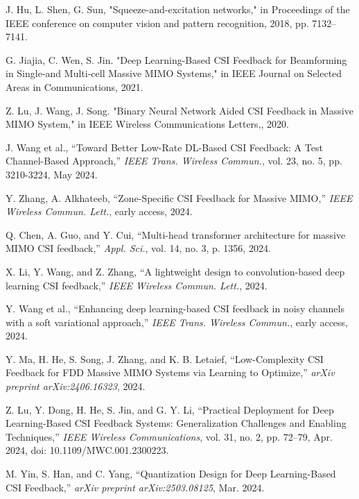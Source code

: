 \documentclass[lettersize,journal]{IEEEtran}
\begin{document}
\begin{thebibliography}{00}
    J. Hu, L. Shen, G. Sun, "Squeeze-and-excitation networks," in Proceedings of the IEEE conference on computer vision and pattern recognition, 2018, pp. 7132–7141.

    G. Jiajia, C. Wen, S. Jin. "Deep Learning-Based CSI Feedback for Beamforming in Single-and Multi-cell Massive MIMO Systems," in IEEE Journal on Selected Areas in Communications, 2021.

    Z. Lu, J. Wang, J. Song. "Binary Neural Network Aided CSI Feedback in Massive MIMO System," in IEEE Wireless Communications Letters,, 2020.

    J. Wang et al., ``Toward Better Low-Rate DL-Based CSI Feedback: A Test Channel-Based Approach,'' \textit{IEEE Trans. Wireless Commun.}, vol. 23, no. 5, pp. 3210-3224, May 2024.

    Y. Zhang, A. Alkhateeb, ``Zone-Specific CSI Feedback for Massive MIMO,'' \textit{IEEE Wireless Commun. Lett.}, early access, 2024.

    Q. Chen, A. Guo, and Y. Cui, ``Multi-head transformer architecture for massive MIMO CSI feedback,'' \textit{Appl. Sci.}, vol. 14, no. 3, p. 1356, 2024.

    X. Li, Y. Wang, and Z. Zhang, ``A lightweight design to convolution-based deep learning CSI feedback,'' \textit{IEEE Wireless Commun. Lett.}, 2024.

    Y. Wang et al., ``Enhancing deep learning-based CSI feedback in noisy channels with a soft variational approach,'' \textit{IEEE Trans. Wireless Commun.}, early access, 2024.

    Y. Ma, H. He, S. Song, J. Zhang, and K. B. Letaief, ``Low-Complexity CSI Feedback for FDD Massive MIMO Systems via Learning to Optimize,'' \textit{arXiv preprint arXiv:2406.16323}, 2024.

    Z. Lu, Y. Dong, H. He, S. Jin, and G. Y. Li, ``Practical Deployment for Deep Learning-Based CSI Feedback Systems: Generalization Challenges and Enabling Techniques,'' \textit{IEEE Wireless Communications}, vol. 31, no. 2, pp. 72--79, Apr. 2024, doi: 10.1109/MWC.001.2300223.

    M. Yin, S. Han, and C. Yang, ``Quantization Design for Deep Learning-Based CSI Feedback,'' \textit{arXiv preprint arXiv:2503.08125}, Mar. 2024.


\end{thebibliography}
\end{document}
